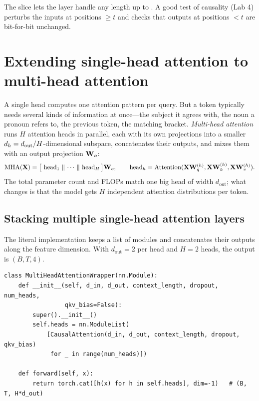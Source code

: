 The slice  lets the layer handle any length up to .
A good test of causality (Lab 4) perturbs the inputs at positions $\ge t$ and checks that outputs at
positions $<t$ are bit-for-bit unchanged.

\section{Extending single-head attention to multi-head attention}\label{sec:attention:mha}

A single head computes one attention pattern per query. But a token typically needs several
kinds of information at once---the subject it agrees with, the noun a pronoun refers to, the
previous token, the matching bracket. \emph{Multi-head attention} runs $H$ attention heads in
parallel, each with its own projections into a smaller $d_{h}=d_{\text{out}}/H$-dimensional
subspace, concatenates their outputs, and mixes them with an output projection $\mathbf{W}_o$:
\begin{equation}
\operatorname{MHA}(\mathbf{X}) = \big[\,\operatorname{head}_1\,\Vert\,\cdots\,\Vert\,\operatorname{head}_H\big]\mathbf{W}_o,\qquad
\operatorname{head}_h = \operatorname{Attention}(\mathbf{X}\mathbf{W}_q^{(h)},\mathbf{X}\mathbf{W}_k^{(h)},\mathbf{X}\mathbf{W}_v^{(h)}).
\end{equation}
The total parameter count and FLOPs match one big head of width $d_{\text{out}}$; what changes is
that the model gets $H$ independent attention distributions per token.

\subsection{Stacking multiple single-head attention layers}
The literal implementation keeps a list of  modules and concatenates their
outputs along the feature dimension. With $d_{\text{out}}=2$ per head and $H=2$ heads, the output is
$(B,T,4)$.

\begin{lstlisting}[caption={Multi-head attention as a list of heads.},label={lst:attention:wrapper}]
class MultiHeadAttentionWrapper(nn.Module):
    def __init__(self, d_in, d_out, context_length, dropout, num_heads,
                 qkv_bias=False):
        super().__init__()
        self.heads = nn.ModuleList(
            [CausalAttention(d_in, d_out, context_length, dropout, qkv_bias)
             for _ in range(num_heads)])

    def forward(self, x):
        return torch.cat([h(x) for h in self.heads], dim=-1)   # (B, T, H*d_out)
\end{lstlisting}


